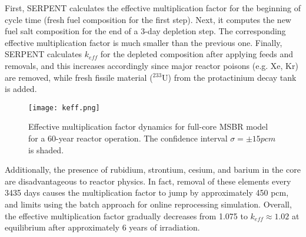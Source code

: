 First, SERPENT calculates the effective multiplication factor for the beginning 
of cycle time (fresh fuel composition for the first step). Next, it computes the 
new fuel salt composition for the end of a 3-day depletion step. The 
corresponding effective multiplication factor is much smaller than the previous 
one. Finally, SERPENT calculates $k_{eff}$ for the depleted composition after 
applying feeds and removals, and this increases accordingly since major reactor 
poisons (e.g. Xe, Kr) are removed, while fresh fissile material ($^{233}$U) from 
the protactinium decay tank is added. 
\begin{figure}[ht!] %
  \centering
  \texttt{[image: keff.png]}
  \caption{Effective multiplication factor dynamics for full-core \gls{MSBR} 
model for a 60-year reactor operation. The confidence interval $\sigma=\pm15pcm$ 
is shaded.}
  \label{fig:keff}
\end{figure}
Additionally, the presence of rubidium, strontium, cesium, and barium in the 
core are disadvantageous to reactor physics. In fact, removal of these elements 
every 3435 days causes the multiplication factor to jump by approximately 450 
pcm, and limits using the batch approach for online reprocessing simulation. 
Overall, the effective multiplication factor gradually decreases from 1.075 to 
$k_{eff} \approx 1.02$ at equilibrium after approximately 6 years of 
irradiation. 

